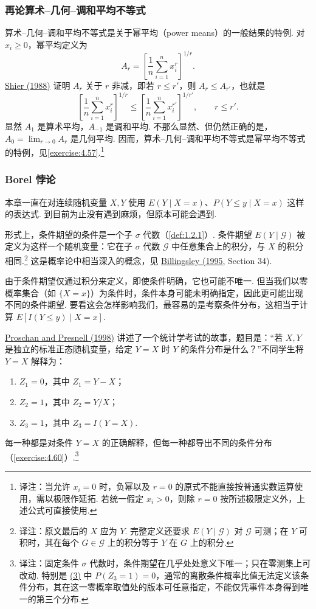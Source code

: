 \subsubsection{再论算术--几何--调和平均不等式}\label{sec:4.9.2}\label{misc:4.9.2}
算术--几何--调和平均不等式是关于幂平均（power means）的一般结果的特例. 对 $x_i\ge0$，幂平均定义为
$$A_r=\left[\frac1n\sum_{i=1}^nx_i^r\right]^{1/r}.$$
\hyperref[bib:source289]{Shier (1988)} 证明 $A_r$ 关于 $r$ 非减，即若 $r\le r'$，则 $A_r\le A_{r'}$，也就是
$$\left[\frac1n\sum_{i=1}^nx_i^r\right]^{1/r}\le\left[\frac1n\sum_{i=1}^nx_i^{r'}\right]^{1/r'},\qquad r\le r'.$$
显然 $A_1$ 是算术平均，$A_{-1}$ 是调和平均. 不那么显然、但仍然正确的是，$A_0=\lim_{r\to0}A_r$ 是几何平均. 因而，算术--几何--调和平均不等式是幂平均不等式的特例，见\autoref{exercise:4.57}.\footnote{译注：当允许 $x_i=0$ 时，负幂以及 $r=0$ 的原式不能直接按普通实数运算使用，需以极限作延拓. 若统一假定 $x_i>0$，则除 $r=0$ 按所述极限定义外，上述公式可直接使用.}

\subsubsection{Borel 悖论}\label{sec:4.9.3}\label{misc:4.9.3}
本章一直在对连续随机变量 $X,Y$ 使用 $E(Y\mid X=x)$、$P(Y\le y\mid X=x)$ 这样的表达式. 到目前为止没有遇到麻烦，但原本可能会遇到.

形式上，条件期望的条件是一个子 $\sigma$ 代数（\autoref{def:1.2.1}）. 条件期望 $E(Y\mid\mathscr G)$ 被定义为这样一个随机变量：它在子 $\sigma$ 代数 $\mathscr G$ 中任意集合上的积分，与 $X$ 的积分相同.\footnote{译注：原文最后的 $X$ 应为 $Y$. 完整定义还要求 $E(Y\mid\mathscr G)$ 对 $\mathscr G$ 可测；在 $Y$ 可积时，其在每个 $G\in\mathscr G$ 上的积分等于 $Y$ 在 $G$ 上的积分.} 这是概率论中相当深入的概念，见 \hyperref[bib:source33]{Billingsley (1995}, Section 34).

由于条件期望仅通过积分来定义，即使条件明确，它也可能不唯一. 但当我们以零概率集合（如 $\{X=x\}$）为条件时，条件本身可能未明确指定，因此更可能出现不同的条件期望. 要看这会怎样影响我们，最容易的是考察条件分布，这相当于计算 $E[I(Y\le y)\mid X=x]$.

\hyperref[bib:source247]{Proschan and Presnell (1998)} 讲述了一个统计学考试的故事，题目是：“若 $X,Y$ 是独立的标准正态随机变量，给定 $Y=X$ 时 $Y$ 的条件分布是什么？”不同学生将 $Y=X$ 解释为：
\begin{enumerate}
\item[(1)] $Z_1=0$，其中 $Z_1=Y-X$；
\item[(2)] $Z_2=1$，其中 $Z_2=Y/X$；
\item[(3)]\label{itm:borel:3} $Z_3=1$，其中 $Z_3=I(Y=X)$.
\end{enumerate}
每一种都是对条件 $Y=X$ 的正确解释，但每一种都导出不同的条件分布（\autoref{exercise:4.60}\mbox{）.}\footnote{译注：固定条件 $\sigma$ 代数时，条件期望在几乎处处意义下唯一；只在零测集上可改动. 特别是 \hyperref[itm:borel:3]{(3)} 中 $P(Z_3=1)=0$，通常的离散条件概率比值无法定义该条件分布，其在这一零概率取值处的版本可任意指定，不能仅凭事件本身得到唯一的第三个分布.}

